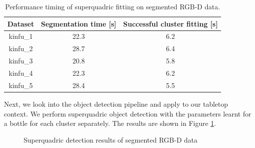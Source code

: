 \documentclass{article}
\begin{document}
\begin{table}
\centering
\begin{tabular}{| c | c | c |}
\hline
Dataset & Segmentation time [s] & Successful cluster fitting [s] \\
\hline
kinfu\_1 & 22.3 & 6.2 \\
kinfu\_2 & 28.7 & 6.4 \\
kinfu\_3 & 20.8 & 5.8 \\
kinfu\_4 & 22.3 & 6.2 \\
kinfu\_5 & 28.4 & 5.5 \\
\hline
\end{tabular}

\caption {Performance timing of superquadric fitting on segmented RGB-D data.}
\label {table:rgbd_fitting_timing}
\end{table}


Next, we look into the object detection pipeline and apply to our tabletop context. We perform superquadric object detection with the parameters learnt for a bottle for each cluster separately. The results are shown in Figure \ref{fig:rgbd_detection}.

\begin{figure}
\centering

\caption{Superquadric detection results of segmented RGB-D data}
\label{fig:rgbd_detection}
\end{figure}
\end{document}
